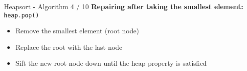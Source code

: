 
\begin{frame}{Heapsort - Algorithm 4 / 10}
  \textbf{Repairing after taking the smallest element:} \texttt{heap.pop()}
  \begin{itemize}
    \item<2- |handout:1>
      Remove the smallest element (root node)
    \item<3- |handout:1>
      Replace the root with the last node
    \item<4- |handout:1>
      {\color{MainA}Sift} the new root node down until the
      {\color{MainA}heap property} is satisfied
  \end{itemize}
\end{frame}



